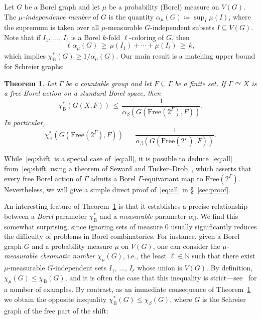 \documentclass[10pt]{amsart}
\newtheorem{theo}[cdrthm]{Theorem}
\theoremstyle{definition}
\newcommand{\0}{\varnothing}
\renewcommand{\leq}{\leqslant}
\renewcommand{\geq}{\geqslant}
\newcommand{\defeq}{\coloneqq}
\newcommand{\N}{{\mathbb{N}}}
\newcommand{\Free}{\mathrm{Free}}
\newcommand{\rmB}{\mathrm{B}}
\begin{document}
Let $G$ be a Borel graph and let $\mu$ be a probability (Borel) measure on $V(G)$. The \emph{$\mu$-independence number} of $G$ is the quantity $\alpha_\mu(G)
\defeq \sup_I \mu(I)$, where the supremum is taken over all $\mu$-measurable $G$-independent subsets $I \subseteq V(G)$. Note that if $I_1,\, \ldots,\, I_\ell$ is a Borel $k$-fold $\ell$-coloring of $G$, then
\[
\ell \alpha_\mu(G) \,\geq\, \mu(I_1) + \cdots + \mu(I_\ell) \,\geq\, k,
\]
which implies $\chi^\ast_\rmB(G) \geq 1/\alpha_\mu(G)$. Our main result is a matching upper bound for Schreier graphs:


\begin{theo}\label{theo:main}
Let $\Gamma$ be a countable group and let $F \subseteq \Gamma$ be a finite set. If $\Gamma \curvearrowright X$ is a free Borel action on a standard Borel space, then
\begin{equation}\label{eq:all}
\chi^\ast_\rmB(G(X,F)) \,\leq\, \frac{1}{\alpha_\beta\left(G\left(\Free\left(2^{\Gamma}\right), F\right)\right)}.
\end{equation}
In particular,
\begin{equation}\label{eq:shift}
\chi^\ast_\rmB\left(G\left(\Free\left(2^{\Gamma}\right), F\right)\right) \,=\, \frac{1}{\alpha_\beta\left(G\left(\Free\left(2^{\Gamma}\right), F\right)\right)}.
\end{equation}
\end{theo}


While~\eqref{eq:shift} is a special case of~\eqref{eq:all}, it is possible to deduce~\eqref{eq:all} from~\eqref{eq:shift} using a theorem of Seward and Tucker--Drob~\cite{STD}, which asserts that every free Borel action of $\Gamma$ admits a Borel $\Gamma$-equivariant map to $\Free(2^\Gamma)$. Nevertheless, we will give a simple direct proof of~\eqref{eq:all} in \S~\ref{sec:proof}.

An interesting feature of Theorem~\ref{theo:main} is that it establishes a precise relationship between a \emph{Borel} parameter $\chi^\ast_\rmB$ and a \emph{measurable} parameter $\alpha_\beta$. We find this somewhat surprising, since ignoring sets of measure $0$ usually significantly reduces the difficulty of problems in Borel combinatorics. For instance, given a Borel graph $G$ and a probability measure $\mu$ on $V(G)$, one can consider the \emph{$\mu$-measurable chromatic number} $\chi_\mu(G)$, i.e., the least $\ell \in \N$ such that there exist $\mu$-measurable $G$-independent sets $I_1,\, \ldots,\, I_\ell$ whose union is $V(G)$. By definition, $\chi_\mu(G) \leq \chi_\rmB(G)$, and it is often the case that this inequality is strict---see~\cite[\S~6]{KechrisMarks} for a number of examples. By contrast, as an immediate consequence of Theorem~\ref{theo:main} we obtain the opposite inequality $\chi_\rmB^\ast(G) \leq \chi_\beta(G)$, where $G$ is the Schreier graph of the free part of the shift:
\end{document}
